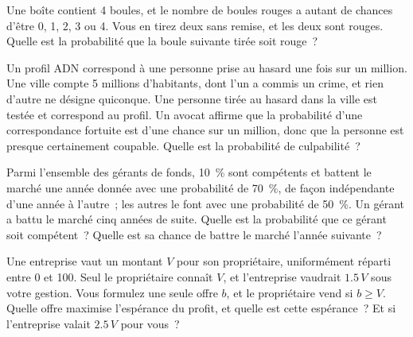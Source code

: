 \begin{question}\label{iq:iv1:conditional-probability-and-bayes:18}
Une boîte contient 4 boules, et le nombre de boules rouges a autant de chances d'être 0, 1, 2, 3 ou 4. Vous en tirez deux sans remise, et les deux sont rouges. Quelle est la probabilité que la boule suivante tirée soit rouge~?
\end{question}

\begin{question}\label{iq:iv1:conditional-probability-and-bayes:19}
Un profil ADN correspond à une personne prise au hasard une fois sur un million. Une ville compte 5 millions d'habitants, dont l'un a commis un crime, et rien d'autre ne désigne quiconque. Une personne tirée au hasard dans la ville est testée et correspond au profil. Un avocat affirme que la probabilité d'une correspondance fortuite est d'une chance sur un million, donc que la personne est presque certainement coupable. Quelle est la probabilité de culpabilité~?
\end{question}

\begin{question}\label{iq:iv1:conditional-probability-and-bayes:20}
Parmi l'ensemble des gérants de fonds, 10~\% sont compétents et battent le marché une année donnée avec une probabilité de 70~\%, de façon indépendante d'une année à l'autre~; les autres le font avec une probabilité de 50~\%. Un gérant a battu le marché cinq années de suite. Quelle est la probabilité que ce gérant soit compétent~? Quelle est sa chance de battre le marché l'année suivante~?
\end{question}

\begin{question}\label{iq:iv1:conditional-probability-and-bayes:21}
Une entreprise vaut un montant $V$ pour son propriétaire, uniformément réparti entre 0 et 100. Seul le propriétaire connaît $V$, et l'entreprise vaudrait $1.5\,V$ sous votre gestion. Vous formulez une seule offre $b$, et le propriétaire vend si $b \ge V$. Quelle offre maximise l'espérance du profit, et quelle est cette espérance~? Et si l'entreprise valait $2.5\,V$ pour vous~?
\end{question}

